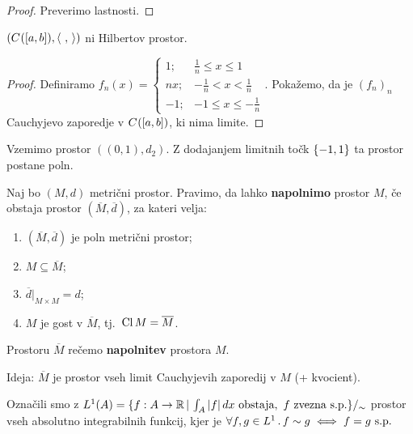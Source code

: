 \begin{proof}
    Preverimo lastnosti.
\end{proof}

\begin{trditev}
    \((C^{}([a,b]), \langle \ , \,  \rangle)\) ni Hilbertov prostor.
\end{trditev}

\begin{proof}
    Definiramo \(f_n(x) = \begin{cases}
        1; &\frac{1}{n} \leq x \leq 1 \\
        nx; &-\frac{1}{n} < x < \frac{1}{n} \\
        -1; &-1 \leq x \leq -\frac{1}{n}
    \end{cases}.\) Pokažemo, da je \((f_n)_n\) Cauchyjevo zaporedje v \(C^{}([a,b])\), ki nima limite.
\end{proof}

\begin{zgled}
    Vzemimo prostor \(((0,1), d_2)\). Z dodajanjem limitnih točk \(\{-1, 1\}\) ta prostor postane poln.
\end{zgled}

\begin{definicija}
    Naj bo \((M, d)\) metrični prostor. Pravimo, da lahko \textbf{napolnimo} prostor \(M\), če obstaja prostor \((\overline{M}, \overline{d})\), za kateri velja:
    \begin{enumerate}
        \item \((\overline{M}, \overline{d})\) je poln metrični prostor;
        \item \(M \subseteq \overline{M}\);
        \item \(\overline{d}|_{M \times M} = d\);
        \item \(M\) je gost v \(\overline{M}\), tj.\ \(\operatorname{Cl} M = \overline{M}\).
    \end{enumerate}
    Prostoru \(\overline{M}\) rečemo \textbf{napolnitev} prostora \(M\).
\end{definicija}

\begin{opomba}
    Ideja: \(\overline{M}\) je prostor vseh limit Cauchyjevih zaporedij v \(M\) (+ kvocient).
\end{opomba}

\begin{opomba}
    Označili smo z \(L^1(A) = \{f: A \to \mathbb{R} \,|\, \int_{A} |f| \, dx \ \text{obstaja}, \ f \ \text{zvezna s.p.}\} /_\sim\) prostor vseh absolutno integrabilnih funkcij, kjer je  \(\all{f, g \in L^1} f \sim g \liff f = g \ \text{s.p.}\)
\end{opomba}

